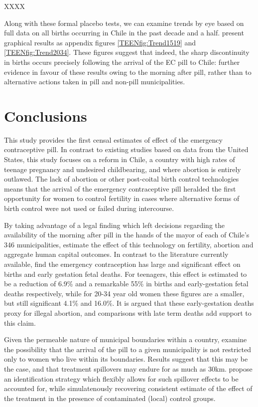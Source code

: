 XXXX

Along with these formal placebo tests, we can examine trends by eye based on
full data on all births occurring in Chile in the past decade and a half. \Person 
present graphical results as appendix figures \ref{TEENfig:Trend1519} and 
\ref{TEENfig:Trend2034}.  These figures suggest that indeed, the sharp 
discontinuity in births occurs precisely following the arrival of the EC pill 
to Chile: further evidence in favour of these results owing to the morning after 
pill, rather than to alternative actions taken in pill and non-pill 
municipalities.

\section{Conclusions}
\label{TEENscn:conclusion}
This study provides the first censal estimates of effect of the emergency
contraceptive pill.  In contrast to existing studies based on data from the 
United States, this study focuses on a reform in Chile, a country with high rates
of teenage pregnancy and undesired childbearing, and where abortion is entirely 
outlawed.  The lack of abortion or other post-coital birth control technologies 
means that the arrival of the emergency contraceptive pill heralded the first 
opportunity for women to control fertility in cases where alternative forms of 
birth control were not used or failed during intercourse.

By taking advantage of a legal finding which left decisions regarding the 
availability of the morning after pill in the hands of the mayor of each of
Chile's 346 municipalities, \person estimate the effect of this technology on 
fertility, abortion and aggregate human capital outcomes. In contrast to the 
literature currently available, \person find the emergency contraception has 
large and significant effect on births and early gestation fetal deaths.  For 
teenagers, this effect is estimated to be a reduction of 6.9\% and a remarkable 
55\% in births and early-gestation fetal deaths respectively, while for 20-34 
year old women these figures are a smaller, but still significant 4.1\% and 
16.0\%.  It is argued that these early-gestation deaths proxy for illegal 
abortion, and comparisons with late term deaths add support to this claim.

Given the permeable nature of municipal boundaries within a country, \person 
examine the possibility that the arrival of the pill to a given municipality
is not restricted only to women who live within its boundaries.  Results
suggest that this may be the case, and that treatment spillovers may endure 
for as much as 30km. \Person propose an identification strategy which flexibly 
allows for such spillover effects to be accounted for, while simulatenously 
recovering consistent estimate of the effect of the treatment in the presence 
of contaminated (local) control groups.

